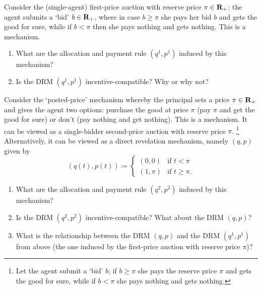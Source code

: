 \begin{exercise}
	\label{exercise:first_price}
	Consider the (single-agent) first-price auction with reserve price $\pi \in \mathbf{R}_+$: the agent submits a `bid' $b \in \mathbf{R}_+$, where in case $b \geq \pi$ she pays her bid $b$ and gets the good for sure, while if $b < \pi$ then she pays nothing and gets nothing. This is a mechanism.
	\begin{enumerate}[label=(\alph*)]
	
		\item What are the allocation and payment rule $\left(q^1,p^1\right)$ induced by this mechanism?

		\item Is the DRM $\left(q^1,p^1\right)$ incentive-compatible? Why or why not?
	
	\end{enumerate}
\end{exercise}

\begin{exercise}
	\label{exercise:posted_price}
	Consider the `posted-price' mechanism whereby the principal sets a price $\pi \in \mathbf{R}_+$ and gives the agent two options: purchase the good at price $\pi$ (pay $\pi$ and get the good for sure) or don't (pay nothing and get nothing). This is a mechanism. It can be viewed as a single-bidder second-price auction with reserve price $\pi$.%
		\footnote{Let the agent submit a `bid' $b$; if $b \geq \pi$ she pays the reserve price $\pi$ and gets the good for sure, while if $b < \pi$ she pays nothing and gets nothing.}
	Alternatively, it can be viewed as a direct revelation mechanism, namely $(q,p)$ given by
	\begin{equation*}
		(q(t),p(t)) \coloneqq
		\begin{cases}
			(0,0)	& \text{if $t<\pi$} \\
			(1,\pi)	& \text{if $t \geq \pi$.}
		\end{cases}
	\end{equation*}
	\begin{enumerate}[label=(\alph*)]
	
		\item What are the allocation and payment rule $\left(q^2,p^2\right)$ induced by this mechanism?

		\item Is the DRM $\left(q^2,p^2\right)$ incentive-compatible? What about the DRM $(q,p)$?

		\item What is the relationship between the DRM $(q,p)$ and the DRM $\left(q^1,p^1\right)$ from  above (the one induced by the first-price auction with reserve price $\pi$)?
	
	\end{enumerate}
\end{exercise}

